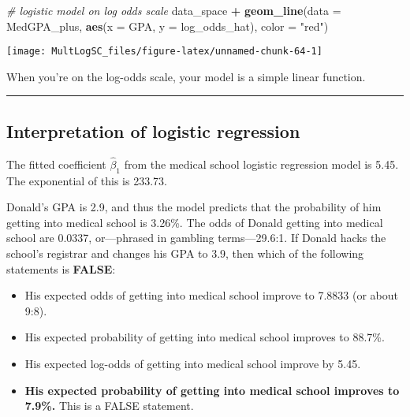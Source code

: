 \documentclass[
]{book}
\newenvironment{Shaded}{\begin{snugshade}}{\end{snugshade}}
\newcommand{\CommentTok}[1]{\textcolor[rgb]{0.56,0.35,0.01}{\textit{#1}}}
\newcommand{\DataTypeTok}[1]{\textcolor[rgb]{0.13,0.29,0.53}{#1}}
\newcommand{\KeywordTok}[1]{\textcolor[rgb]{0.13,0.29,0.53}{\textbf{#1}}}
\newcommand{\NormalTok}[1]{#1}
\newcommand{\OperatorTok}[1]{\textcolor[rgb]{0.81,0.36,0.00}{\textbf{#1}}}
\newcommand{\StringTok}[1]{\textcolor[rgb]{0.31,0.60,0.02}{#1}}
\begin{document}
\begin{Shaded}
\begin{Highlighting}[]
\CommentTok{# logistic model on log odds scale}
\NormalTok{data_space }\OperatorTok{+}
\StringTok{  }\KeywordTok{geom_line}\NormalTok{(}\DataTypeTok{data =}\NormalTok{ MedGPA_plus, }\KeywordTok{aes}\NormalTok{(}\DataTypeTok{x =}\NormalTok{ GPA, }\DataTypeTok{y =}\NormalTok{ log_odds_hat), }\DataTypeTok{color =} \StringTok{"red"}\NormalTok{)}
\end{Highlighting}
\end{Shaded}

\begin{center}\texttt{[image: MultLogSC\_files/figure-latex/unnamed-chunk-64-1]} \end{center}

When you're on the log-odds scale, your model is a simple linear function.

\begin{center}\rule{0.5\linewidth}{0.5pt}\end{center}

\hypertarget{interpretation-of-logistic-regression}{%
\subsection*{Interpretation of logistic regression}\label{interpretation-of-logistic-regression}}

The fitted coefficient \(\hat\beta_1\) from the medical school logistic regression model is 5.45. The exponential of this is 233.73.

Donald's GPA is 2.9, and thus the model predicts that the probability of him getting into medical school is 3.26\%. The odds of Donald getting into medical school are 0.0337, or---phrased in gambling terms---29.6:1. If Donald hacks the school's registrar and changes his GPA to 3.9, then which of the following statements is \textbf{FALSE}:

\begin{itemize}
\item
  His expected odds of getting into medical school improve to 7.8833 (or about 9:8).
\item
  His expected probability of getting into medical school improves to 88.7\%.
\item
  His expected log-odds of getting into medical school improve by 5.45.
\item
  \textbf{His expected probability of getting into medical school improves to 7.9\%.} This is a FALSE statement.
\end{itemize}
\end{document}
